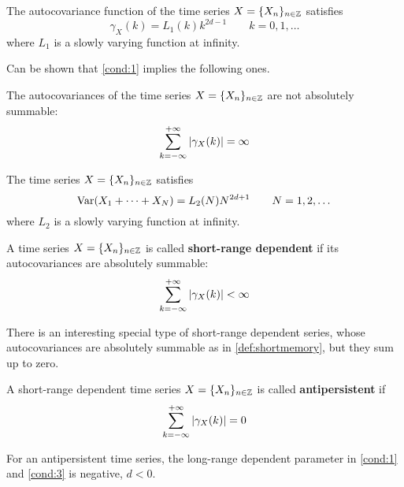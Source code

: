 \begin{condition}\label{cond:1}
	The autocovariance function of the time series $X = \{ X_n \}_{n \in \mathbb{Z}}$ satisfies
	\begin{equation}
		\gamma_X(k) = L_1(k) k^{2d -1} \qquad k=0,1,\dots
	\end{equation}
	where $L_1$ is a slowly varying function at infinity.
\end{condition}

Can be shown that \autoref{cond:1} implies the following ones.\\ 
\begin{condition}\label{cond:2}
	The autocovariances of the time series $X = \{ X_n \}_{n \in \mathbb{Z}}$ are not absolutely summable:
	\begin{equation}
		\sum_{k=-\infty}^{+\infty} \abs{\gamma_X(k)} = \infty
	\end{equation}
\end{condition}

\begin{condition}\label{cond:3}
	The time series $X = \{ X_n \}_{n \in \mathbb{Z}}$ satisfies
	\begin{equation}
		\textnormal{Var}(X_1 + \dots + X_N) = L_2(N) N^{2d + 1} \qquad N = 1, 2, \dots
	\end{equation}
	where $L_2$ is a slowly varying function at infinity.
\end{condition}

\begin{definition}\label{def:shortmemory}
	A time series $X = \{ X_n \}_{n \in \mathbb{Z}}$ is called \textbf{short-range dependent} if its autocovariances are absolutely summable:
	\begin{equation}
		\sum_{k=-\infty}^{+\infty} \abs{\gamma_X(k)} < \infty
	\end{equation}
\end{definition}

There is an interesting special type of short-range dependent series, whose autocovariances are absolutely summable as in \autoref{def:shortmemory}, but they sum up to zero.
\begin{definition}
	A short-range dependent time series $X = \{ X_n \}_{n \in \mathbb{Z}}$ is called \textbf{antipersistent} if
	\begin{equation}
		\sum_{k=-\infty}^{+\infty} \abs{\gamma_X(k)} = 0
	\end{equation}
\end{definition}

For an antipersistent time series, the long-range dependent parameter in \autoref{cond:1} and \autoref{cond:3} is negative, $d < 0$.

